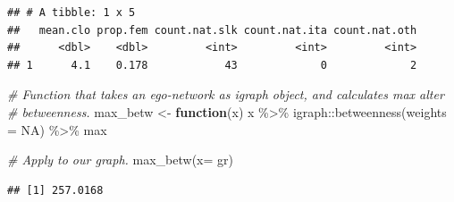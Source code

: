 \documentclass[
]{book}
\newenvironment{Shaded}{\begin{snugshade}}{\end{snugshade}}
\newcommand{\AttributeTok}[1]{\textcolor[rgb]{0.77,0.63,0.00}{#1}}
\newcommand{\CommentTok}[1]{\textcolor[rgb]{0.56,0.35,0.01}{\textit{#1}}}
\newcommand{\ConstantTok}[1]{\textcolor[rgb]{0.00,0.00,0.00}{#1}}
\newcommand{\ControlFlowTok}[1]{\textcolor[rgb]{0.13,0.29,0.53}{\textbf{#1}}}
\newcommand{\DecValTok}[1]{\textcolor[rgb]{0.00,0.00,0.81}{#1}}
\newcommand{\FunctionTok}[1]{\textcolor[rgb]{0.00,0.00,0.00}{#1}}
\newcommand{\NormalTok}[1]{#1}
\newcommand{\OtherTok}[1]{\textcolor[rgb]{0.56,0.35,0.01}{#1}}
\newcommand{\SpecialCharTok}[1]{\textcolor[rgb]{0.00,0.00,0.00}{#1}}
\begin{document}
\begin{verbatim}
## # A tibble: 1 x 5
##   mean.clo prop.fem count.nat.slk count.nat.ita count.nat.oth
##      <dbl>    <dbl>         <int>         <int>         <int>
## 1      4.1    0.178            43             0             2
\end{verbatim}

\begin{Shaded}
\begin{Highlighting}[]
\CommentTok{\# Function that takes an ego{-}network as igraph object, and calculates max alter}
\CommentTok{\# betweenness.}
\NormalTok{max\_betw }\OtherTok{\textless{}{-}} \ControlFlowTok{function}\NormalTok{(x) x }\SpecialCharTok{\%\textgreater{}\%}\NormalTok{ igraph}\SpecialCharTok{::}\FunctionTok{betweenness}\NormalTok{(}\AttributeTok{weights =} \ConstantTok{NA}\NormalTok{) }\SpecialCharTok{\%\textgreater{}\%}\NormalTok{ max}

\CommentTok{\# Apply to our graph.}
\FunctionTok{max\_betw}\NormalTok{(}\AttributeTok{x=}\NormalTok{ gr)}
\end{Highlighting}
\end{Shaded}

\begin{verbatim}
## [1] 257.0168
\end{verbatim}

\begin{Shaded}
\end{Shaded}
\end{document}
